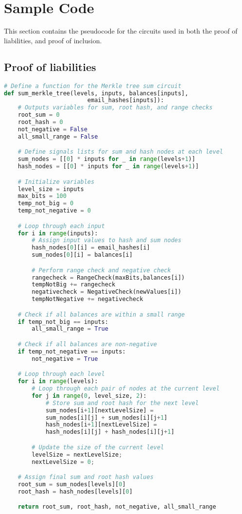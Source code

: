
\appendix
\section{\\Sample Code}
This section contains the pseudocode for the circuits used in both the proof of liabilities, and proof of inclusion.

\subsection{Proof of liabilities}
\label{subsec:plc}
\begin{lstlisting}[language=Python, caption=Liabilities circuit pseudocode]
# Define a function for the Merkle tree sum circuit
def sum_merkle_tree(levels, inputs, balances[inputs], 
                        email_hashes[inputs]):
    # Outputs variables for sum, root hash, and range checks
    root_sum = 0
    root_hash = 0
    not_negative = False
    all_small_range = False

    # Define signals lists for sum and hash nodes at each level
    sum_nodes = [[0] * inputs for _ in range(levels+1)]
    hash_nodes = [[0] * inputs for _ in range(levels+1)]

    # Initialize variables
    level_size = inputs
    max_bits = 100
    temp_not_big = 0
    temp_not_negative = 0

    # Loop through each input
    for i in range(inputs):
        # Assign input values to hash and sum nodes
        hash_nodes[0][i] = email_hashes[i]
        sum_nodes[0][i] = balances[i]

        # Perform range check and negative check
        rangecheck = RangeCheck(maxBits,balances[i])
        tempNotBig += rangecheck
        negativecheck = NegativeCheck(newValues[i])
        tempNotNegative += negativecheck

    # Check if all balances are within a small range
    if temp_not_big == inputs:
        all_small_range = True

    # Check if all balances are non-negative
    if temp_not_negative == inputs:
        not_negative = True

    # Loop through each level
    for i in range(levels):
        # Loop through each pair of nodes at the current level
        for j in range(0, level_size, 2):
            # Store sum and root hash for the next level
            sum_nodes[i+1][nextLevelSize] = 
            sum_nodes[i][j] + sum_nodes[i][j+1]
            hash_nodes[i+1][nextLevelSize] = 
            hash_nodes[i][j] + hash_nodes[i][j+1]

        # Update the size of the current level
        levelSize = nextLevelSize;
        nextLevelSize = 0;

    # Assign final sum and root hash values
    root_sum = sum_nodes[levels][0]
    root_hash = hash_nodes[levels][0]

    return root_sum, root_hash, not_negative, all_small_range

\end{lstlisting}

